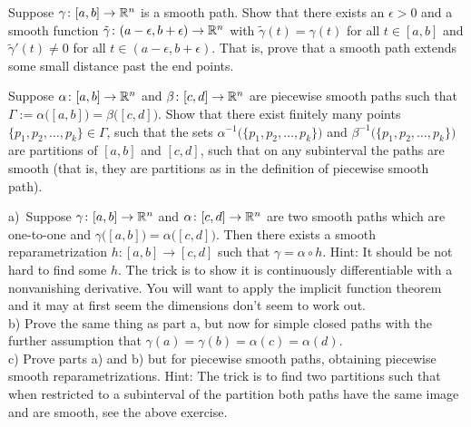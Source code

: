 \begin{exercise}
Suppose $\gamma \colon [a,b] \to {\mathbb{R}}^n$ is a smooth path.
Show that there exists an $\epsilon > 0$ and a smooth function
$\tilde{\gamma} \colon (a-\epsilon,b+\epsilon) \to {\mathbb{R}}^n$
with $\tilde{\gamma}(t) = \gamma(t)$ for all $t \in [a,b]$
and $\tilde{\gamma}'(t) \not= 0$ for all $t \in 
(a-\epsilon,b+\epsilon)$.  That is, prove that a smooth path extends
some small distance past the end points.
\end{exercise}

\begin{exercise} 
Suppose $\alpha \colon [a,b] \to {\mathbb{R}}^n$ and
$\beta \colon [c,d] \to {\mathbb{R}}^n$ are piecewise smooth paths such that
$\Gamma := \alpha\bigl([a,b]\bigr) = \beta\bigl([c,d]\bigr)$.
Show that there exist finitely many points
$\{ p_1,p_2,\ldots,p_k\} \in \Gamma$, such that
the sets
$\alpha^{-1}\bigl( \{ p_1,p_2,\ldots,p_k\} \bigr)$
and
$\beta^{-1}\bigl( \{ p_1,p_2,\ldots,p_k\} \bigr)$
are partitions of $[a,b]$ and $[c,d]$, such that on any subinterval
the paths are smooth (that is, they are partitions as in the definition
of piecewise smooth path).
\end{exercise}

\begin{exercise}
a)~Suppose $\gamma \colon [a,b] \to {\mathbb{R}}^n$ and $\alpha \colon [c,d] \to {\mathbb{R}}^n$
are two smooth paths which are one-to-one and
$\gamma\bigl([a,b]\bigr) = \alpha\bigl([c,d]\bigr)$.  Then
there exists a smooth reparametrization $h \colon [a,b] \to [c,d]$
such that $\gamma = \alpha \circ h$.  Hint: It should be not hard to find
some $h$.  The trick is to show it is continuously differentiable
with a nonvanishing derivative.  You will want to apply the implicit function
theorem and it may at first seem the dimensions don't seem to work out.
\\
b) Prove the same thing as part a, but now for simple closed paths with the
further assumption that $\gamma(a) = \gamma(b) = \alpha(c) = \alpha(d)$.
\\
c) Prove parts a) and b) but for piecewise smooth paths, obtaining
piecewise smooth reparametrizations.  Hint: The trick is to find two
partitions such that when restricted to a subinterval of the partition
both paths have the same image and are smooth, see the above exercise.
\end{exercise}

